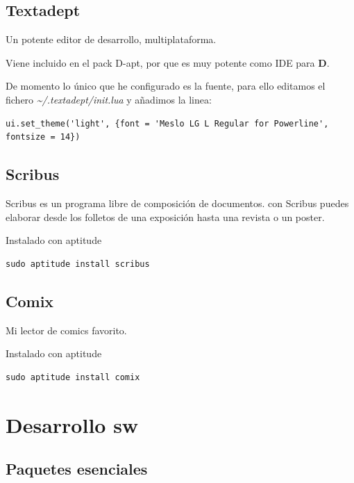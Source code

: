 \documentclass[12pt,spanish,]{scrartcl}
\begin{document}
\hypertarget{textadept}{%
\subsection{Textadept}\label{textadept}}

Un potente editor de desarrollo, multiplataforma.

Viene incluido en el pack D-apt, por que es muy potente como IDE para
\textbf{D}.

De momento lo único que he configurado es la fuente, para ello editamos
el fichero \emph{\textasciitilde{}/.textadept/init.lua} y añadimos la
linea:

\begin{verbatim}
ui.set_theme('light', {font = 'Meslo LG L Regular for Powerline', fontsize = 14})
\end{verbatim}

\hypertarget{scribus}{%
\subsection{Scribus}\label{scribus}}

Scribus es un programa libre de composición de documentos. con Scribus
puedes elaborar desde los folletos de una exposición hasta una revista o
un poster.

Instalado con aptitude

\begin{verbatim}
sudo aptitude install scribus
\end{verbatim}

\hypertarget{comix}{%
\subsection{Comix}\label{comix}}

Mi lector de comics favorito.

Instalado con aptitude

\begin{verbatim}
sudo aptitude install comix
\end{verbatim}

\hypertarget{desarrollo-sw}{%
\section{Desarrollo sw}\label{desarrollo-sw}}

\hypertarget{paquetes-esenciales}{%
\subsection{Paquetes esenciales}\label{paquetes-esenciales}}
\end{document}
